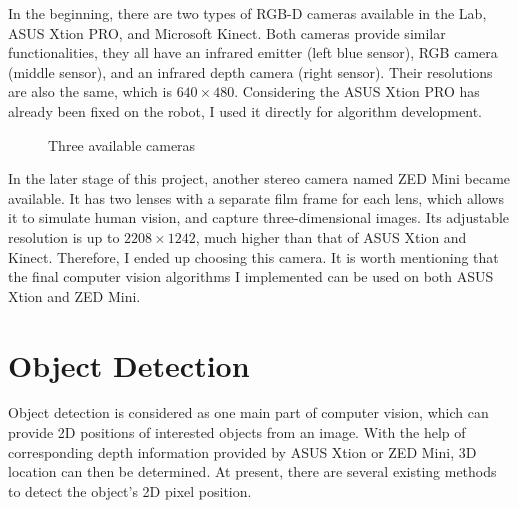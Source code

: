 In the beginning, there are two types of RGB-D cameras available in the Lab, ASUS Xtion PRO, and Microsoft Kinect. Both cameras provide similar functionalities, they all have an infrared emitter (left blue sensor), RGB camera (middle sensor), and an infrared depth camera (right sensor). Their resolutions are also the same, which is $640 \times 480$. Considering the ASUS Xtion PRO has already been fixed on the robot, I used it directly for algorithm development.

\begin{figure}[H]
\centering
{}
\caption{Three available cameras}
\label{camera}
\end{figure}

In the later stage of this project, another stereo camera named ZED Mini became available. It has two lenses with a separate film frame for each lens, which allows it to simulate human vision, and capture three-dimensional images. Its adjustable resolution is up to $2208 \times 1242$, much higher than that of ASUS Xtion and Kinect. Therefore, I ended up choosing this camera. It is worth mentioning that the final computer vision algorithms I implemented can be used on both ASUS Xtion and ZED Mini.


\section{Object Detection} \label{od}
Object detection is considered as one main part of computer vision, which can provide 2D positions of interested objects from an image. With the help of corresponding depth information provided by ASUS Xtion or ZED Mini, 3D location can then be determined. At present, there are several existing methods to detect the object's 2D pixel position.

